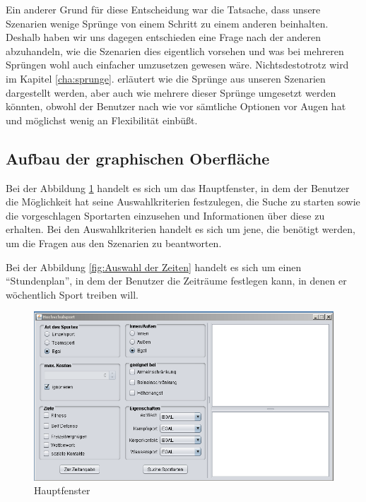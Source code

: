 Ein anderer Grund f\"ur diese Entscheidung war die Tatsache, dass unsere Szenarien wenige Spr\"unge von einem Schritt zu einem anderen beinhalten. Deshalb haben wir uns dagegen entschieden eine Frage nach der anderen abzuhandeln, wie die Szenarien dies eigentlich vorsehen und was bei mehreren Spr\"ungen wohl auch einfacher umzusetzen gewesen w\"are. Nichtsdestotrotz wird im Kapitel \ref{cha:sprunge}.  erl\"autert wie die Spr\"unge aus unseren Szenarien dargestellt werden, aber auch wie mehrere dieser Spr\"unge umgesetzt werden k\"onnten, obwohl der Benutzer nach wie vor s\"amtliche Optionen vor Augen hat und m\"oglichst wenig an Flexibilit\"at einb\"ußt.

\subsection{Aufbau der graphischen Oberfl\"ache}

Bei der Abbildung \ref{fig:Hauptfenster} handelt es sich um das Hauptfenster, in dem der Benutzer die M\"oglichkeit hat seine Auswahlkriterien festzulegen, die Suche zu starten sowie die vorgeschlagen Sportarten einzusehen und Informationen \"uber diese zu erhalten. Bei den Auswahlkriterien handelt es sich um jene, die ben\"otigt werden, um die Fragen aus den Szenarien zu beantworten.

Bei der Abbildung \ref{fig:Auswahl der Zeiten} handelt es sich um einen "`Stundenplan"', in dem der Benutzer die Zeitr\"aume festlegen kann, in denen er w\"ochentlich Sport treiben will. 



\begin{figure}[p]
\centering
\includegraphics[width=\textwidth]{images/gui.png}%
\caption{Hauptfenster}
\label{fig:Hauptfenster}
\end{figure}

